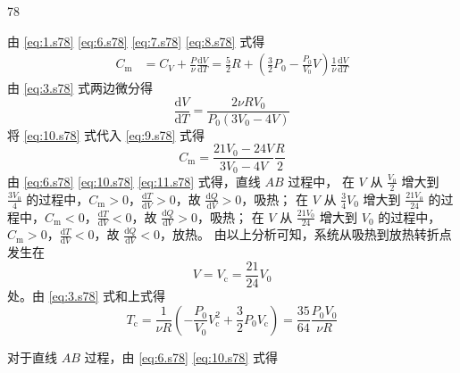 \begin{solution}{78}
\begin{subsolution}
\begin{equation}
            \label{eq:8.s78}
        \end{equation}
        由 \eqref{eq:1.s78} \eqref{eq:6.s78} \eqref{eq:7.s78} \eqref{eq:8.s78} 式得
        \begin{align}
            C_{\mathrm{m}} &= C_{V} + \frac{P}{\nu} \frac{\mathrm{d} V}{\mathrm{d} T} = \frac{5}{2} R + \left(\frac{3}{2} P_{0} - \frac{P_{0}}{V_{0}} V\right) \frac{1}{\nu} \frac{\mathrm{d} V}{\mathrm{d} T}
            \label{eq:9.s78}
        \end{align}
        由 \eqref{eq:3.s78} 式两边微分得
        \begin{equation}
            \frac{\mathrm{d} V}{\mathrm{d} T} = \frac{2 \nu R V_{0}}{P_{0} (3 V_{0} - 4 V)}
            \label{eq:10.s78}
        \end{equation}
        将 \eqref{eq:10.s78} 式代入 \eqref{eq:9.s78} 式得
        \begin{equation}
            C_{\mathrm{m}} = \frac{21 V_{0} - 24 V}{3 V_{0} - 4 V} \frac{R}{2}
            \label{eq:11.s78}
        \end{equation}
        由 \eqref{eq:6.s78} \eqref{eq:10.s78} \eqref{eq:11.s78} 式得，直线 $AB$ 过程中，
        在 $V$ 从 $\frac{V_{0}}{2}$ 增大到 $\frac{3 V_{0}}{4}$ 的过程中，$C_{\mathrm{m}} > 0$，$\frac{\mathrm{d}T}{\mathrm{d}V} > 0$，故 $\frac{\mathrm{d}Q}{\mathrm{d}V} > 0$，吸热；
        在 $V$ 从 $\frac{3}{4} V_{0}$ 增大到 $\frac{21 V_{0}}{24}$ 的过程中，$C_{\mathrm{m}} < 0$，$\frac{\mathrm{d}T}{\mathrm{d}V} < 0$，故 $\frac{\mathrm{d}Q}{\mathrm{d}V} > 0$，吸热；
        在 $V$ 从 $\frac{21 V_{0}}{24}$ 增大到 $V_{0}$ 的过程中，$C_{\mathrm{m}} > 0$，$\frac{\mathrm{d}T}{\mathrm{d}V} < 0$，故 $\frac{\mathrm{d}Q}{\mathrm{d}V} < 0$，放热。
        由以上分析可知，系统从吸热到放热转折点发生在
        \begin{equation}
            V = V_{\mathrm{c}} = \frac{21}{24} V_{0}
            \label{eq:12.s78}
        \end{equation}
        处。由 \eqref{eq:3.s78} 式和上式得
        \begin{equation}
            T_{\mathrm{c}} = \frac{1}{\nu R} \left(- \frac{P_{0}}{V_{0}} V_{\mathrm{c}}^{2} + \frac{3}{2} P_{0} V_{\mathrm{c}}\right) = \frac{35}{64} \frac{P_{0} V_{0}}{\nu R}
            \label{eq:13.s78}
        \end{equation}
    \end{subsolution}
    \begin{subsolution}
        对于直线 $AB$ 过程，由 \eqref{eq:6.s78} \eqref{eq:10.s78} 式得
        \begin{equation}

\end{equation}
\end{subsolution}
\end{solution}

